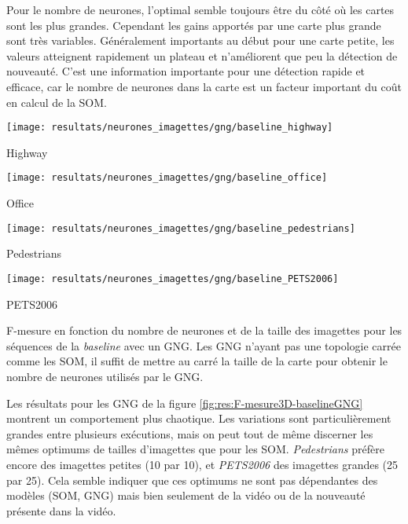 	Pour le nombre de neurones, l'optimal semble toujours être du côté où les cartes sont les plus grandes. Cependant les gains apportés par une carte plus grande sont très variables. Généralement importants au début pour une carte petite, les valeurs atteignent rapidement un plateau et n'améliorent que peu la détection de nouveauté. C'est une information importante pour une détection rapide et efficace, car le nombre de neurones dans la carte est un facteur important du coût en calcul de la SOM.

	\begin{figureth}
		\begin{subfigureth}{.45\textwidth}
			\texttt{[image: resultats/neurones\_imagettes/gng/baseline\_highway]}\caption{Highway}
		\end{subfigureth}
		\begin{subfigureth}{.45\textwidth}
			\texttt{[image: resultats/neurones\_imagettes/gng/baseline\_office]}\caption{Office}
		\end{subfigureth}
		\begin{subfigureth}{.45\textwidth}
			\texttt{[image: resultats/neurones\_imagettes/gng/baseline\_pedestrians]}\caption{Pedestrians}
		\end{subfigureth}
		\begin{subfigureth}{.45\textwidth}
			\texttt{[image: resultats/neurones\_imagettes/gng/baseline\_PETS2006]}\caption{PETS2006}
		\end{subfigureth}
		\caption[Nombre de neurones et de taille des imagettes, GNG/baseline]{F-mesure en fonction du nombre de neurones et de la taille des imagettes pour les séquences de la \textit{baseline} avec un GNG. Les GNG n'ayant pas une topologie carrée comme les SOM, il suffit de mettre au carré la taille de la carte pour obtenir le nombre de neurones utilisés par le GNG.}\label{fig:res:F-mesure3D-baselineGNG}
	\end{figureth}

	Les résultats pour les GNG de la figure \ref{fig:res:F-mesure3D-baselineGNG} montrent un comportement plus chaotique. Les variations sont particulièrement grandes entre plusieurs exécutions, mais on peut tout de même discerner les mêmes optimums de tailles d'imagettes que pour les SOM. \textit{Pedestrians} préfère encore des imagettes petites (10 par 10), et \textit{PETS2006} des imagettes grandes (25 par 25). Cela semble indiquer que ces optimums ne sont pas dépendantes des modèles (SOM, GNG) mais bien seulement de la vidéo ou de la nouveauté présente dans la vidéo.

